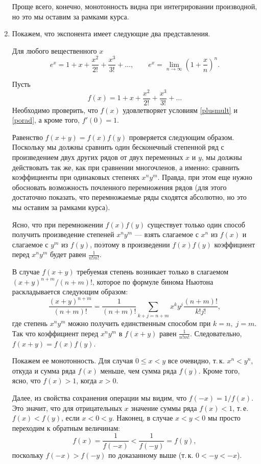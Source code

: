 \begin{enumerate}
Проще всего, конечно, монотонность видна при интегрировании производной, но это мы оставим за рамками курса.





\item Покажем, что экспонента имеет следующие два представления.
\begin{thrm}\label{exp-series-lim} Для любого вещественного $x$
$$
e^x = 1+x+\frac{x^2}{2!}+\frac{x^3}{3!}+\dots,\qquad e^x=\lim_{n\to\infty}\left(1+\frac xn\right)^n.
$$
\end{thrm}
\pf
Пусть
$$
f(x) = 1+x+\frac{x^2}{2!}+\frac{x^3}{3!}+\dots
$$
Необходимо проверить, что $f(x)$ удовлетворяет условиям \eqref{plusmult} и \eqref{porad}, а кроме того, $f'(0)=1$.

Равенство $f(x+y)=f(x)f(y)$ проверяется следующим образом. Поскольку мы должны сравнить один бесконечный степенной ряд с произведением двух других рядов от двух переменных $x$ и $y$, мы должны действовать так же, как при сравнении многочленов, а именно: сравнить коэффициенты при одинаковых степенях $x^ny^m$. Правда, при этом еще нужно обосновать возможность почленного перемножения рядов (для этого достаточно показать, что перемножаемые ряды сходятся абсолютно, но это мы оставим за рамками курса).

Ясно, что при перемножении $f(x)f(y)$ существует только один способ получить произведение степеней $x^ny^m$ --- взять слагаемое с $x^n$ из $f(x)$ и слагаемое с $y^m$ из $f(y)$, поэтому в произведении $f(x)f(y)$ коэффициент перед $x^ny^m$ будет равен $\frac{1}{n!m!}$.

В случае $f(x+y)$ требуемая степень возникает только в слагаемом $(x+y)^{n+m}/(n+m)!$, которое по формуле бинома Ньютона раскладывается следующим образом:
$$
\frac{(x+y)^{n+m}}{(n+m)!} = \frac{1}{(n+m)!}\sum_{k+j=n+m}x^ky^j\frac{(n+m)!}{k!j!},
$$
где степень $x^ny^m$ можно получить единственным способом при $k=n,\; j=m$. Так что коэффициент перед $x^ny^m$ в $f(x+y)$ равен $\frac{1}{n!m!}$. Следовательно, $f(x+y)=f(x)f(y)$.

Покажем ее монотонность. Для случая $0\le x<y$ все очевидно, т.\,к. $x^n<y^n$, откуда и сумма ряда $f(x)$ меньше, чем сумма ряда $f(y)$. Кроме того, ясно, что $f(x)>1$, когда $x>0$.

Далее, из свойства сохранения операции мы видим, что $f(-x)=1/f(x)$. Это значит, что для отрицательных $x$ значение суммы ряда $f(x)<1$, т.\,е. $f(x)<f(y)$, если $x<0<y$. Наконец, в случае $x<y<0$ мы просто переходим к обратным величинам:
$$
f(x)=\frac{1}{f(-x)}<\frac{1}{f(-y)}=f(y),
$$
поскольку $f(-x)>f(-y)$ по доказанному выше (т.\,к. $0<-y<-x$).


\end{enumerate}

